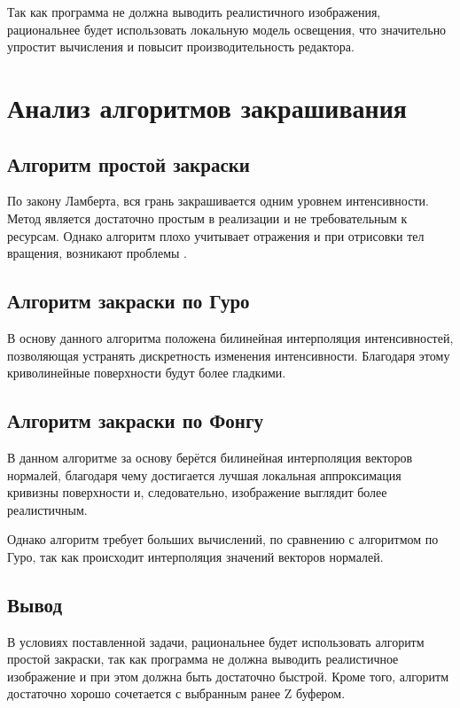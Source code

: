Так как программа не должна выводить реалистичного изображения, рациональнее будет использовать локальную модель освещения, что значительно упростит вычисления и повысит производительность редактора.


\section{Анализ алгоритмов закрашивания}

\subsection{Алгоритм простой закраски}

По закону Ламберта, вся грань закрашивается одним уровнем интенсивности. Метод является достаточно простым в реализации и не требовательным к ресурсам. Однако алгоритм плохо учитывает отражения и при отрисовки тел вращения, возникают проблемы \cite{coloring}.

\subsection{Алгоритм закраски по Гуро}

В основу данного алгоритма положена билинейная интерполяция интенсивностей, позволяющая устранять дискретность изменения интенсивности. Благодаря этому криволинейные поверхности будут более гладкими\cite{coloring}.


\subsection{Алгоритм закраски по Фонгу}

В данном алгоритме за основу берётся билинейная интерполяция векторов нормалей, благодаря чему достигается лучшая локальная аппроксимация кривизны поверхности и, следовательно, изображение выглядит более реалистичным\cite{coloring}.

Однако алгоритм требует больших вычислений, по сравнению с алгоритмом по Гуро, так как происходит интерполяция значений векторов нормалей.

\subsection*{Вывод}

В условиях поставленной задачи, рациональнее будет использовать алгоритм простой закраски, так как программа не должна выводить реалистичное изображение и при этом должна быть достаточно быстрой. Кроме того, алгоритм достаточно хорошо сочетается с выбранным ранее Z буфером.